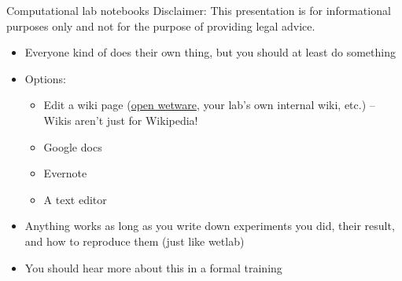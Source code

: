 \begin{frame}{Computational lab notebooks}
  Disclaimer: This presentation is for informational purposes only and not for the purpose of providing legal advice. 
  \begin{itemize}
  \item Everyone kind of does their own thing, but you should at least do something
  \item Options:
    \begin{itemize}
    \item Edit a wiki page
      (\href{http://openwetware.org/wiki/Main_Page}{open wetware}, 
      your lab's own internal wiki, etc.) -- Wikis aren't just for Wikipedia!

    \item Google docs
    \item Evernote
    \item A text editor
    \end{itemize}

  \item Anything works as long as you write down experiments you did,
    their result, and how to reproduce them (just like wetlab)
  \item You should hear more about this in a formal training
  \end{itemize}
\end{frame}